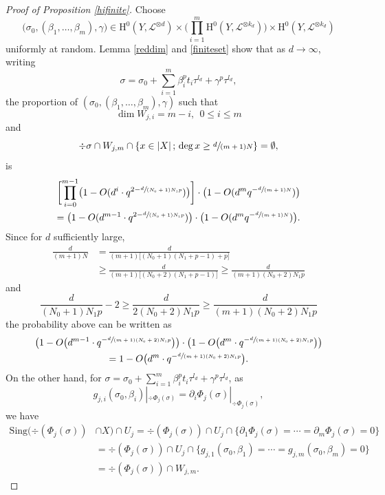 \documentclass[JEP,XML,SOM,Unicode,published]{cedram}
\newcommand{\sep}{\,;\,}
\theoremstyle{plain}
\theoremstyle{definition}
\newcommand{\ho}{\mathrm{H}}
\begin{document}
\begin{proof}[Proof of Proposition \ref{hifinite}]
Choose
\[
\bigl(\sigma_0, (\beta_1,\dots, \beta_m), \gamma\bigr)\in \ho^0(Y,\mathcal{L}^{\otimes d})\times \biggl(\prod_{i=1}^m \ho^0(Y,\mathcal{L}^{\otimes k_d}) \biggr) \times \ho^0(Y, \mathcal{L}^{\otimes k_d})
\]
uniformly at random. Lemma \ref{reddim} and \ref{finiteset} show that as $d\to \infty$, writing
\[
\sigma=\sigma_0+\sum_{i=1}^{m} \beta_i^pt_i\tau^{l_d}+\gamma^p\tau^{l_d},
\]
the proportion of $(\sigma_0, (\beta_1,\dots, \beta_m), \gamma)$ such that
\[
\dim W_{j,i}=m-i,\ \ 0\leq i\leq m
\]
and
\[
\div \sigma\cap W_{j,m}\cap \left\{ x\in |X|\sep \deg x\geq\sfrac{d}{(m+1)N} \right\}=\emptyset,
\]
is
\begin{multline*}
\biggl[ \prod_{i=0}^{m-1}\bigl(1-O(d^i\cdot q^{2-\sfrac{d}{(N_0+1)N_1p}})\bigr) \biggr]\cdot \bigl(1-O(d^m q^{-\sfrac{d}{(m+1)N}}) \bigr) \\
=\bigl(1-O(d^{m-1}\cdot q^{2-\sfrac{d}{(N_0+1)N_1p}})\bigr)\cdot \bigl(1-O(d^m q^{-\sfrac{d}{(m+1)N}}) \bigr).
\end{multline*}
Since for $d$ sufficiently large,
\begin{align*}
\frac{d}{(m+1)N}&= \frac{d}{(m+1)\big[(N_0+1)(N_1+p-1)+p\big]}\\
&\geq \frac{d}{(m+1)\big[(N_0+2)(N_1+p-1)\big]}\geq \frac{d}{(m+1)(N_0+2)N_1 p}
\end{align*}
and
\[
\frac{d}{(N_0+1)N_1p}-2\geq \frac{d}{2(N_0+2)N_1 p}\geq \frac{d}{(m+1)(N_0+2)N_1 p}
\]
the probability above can be written as
\begin{multline*}
\bigl(1-O\bigl(d^{m-1}\cdot q^{-\sfrac{d}{(m+1)(N_0+2)N_1 p}}\bigr)\bigr)\cdot \bigl(1-O\bigl(d^{m}\cdot q^{-\sfrac{d}{(m+1)(N_0+2)N_1 p}}\bigr)\bigr)\\
=1-O\bigl(d^{m}\cdot q^{-\sfrac{d}{(m+1)(N_0+2)N_1 p}}\bigr).
\end{multline*}
On the other hand, for $\sigma=\sigma_0+\sum_{i=1}^{m} \beta_i^pt_i\tau^{l_d}+\gamma^p\tau^{l_d}$, as
\[
g_{j,i}(\sigma_0,\beta_i)|_{ \div \Phi_{j}(\sigma)}=\partial_i\Phi_{j}(\sigma)|_{ \div \Phi_{j}(\sigma)},
\]
we have
\begin{align*}
\mathrm{Sing}(\div (\Phi_j(\sigma))&\cap X)\cap U_j
= \div (\Phi_j(\sigma))\cap U_j\cap \{ \partial_1\Phi_j(\sigma)=\cdots=\partial_m\Phi_j(\sigma)=0 \}\\
&=\div (\Phi_j(\sigma))\cap U_j\cap \{ g_{j,1}(\sigma_0,\beta_1)=\cdots=g_{j,m}(\sigma_0,\beta_m)=0\} \\
&= \div (\Phi_j(\sigma))\cap W_{j,m}.

\end{align*}
\end{proof}
\end{document}

